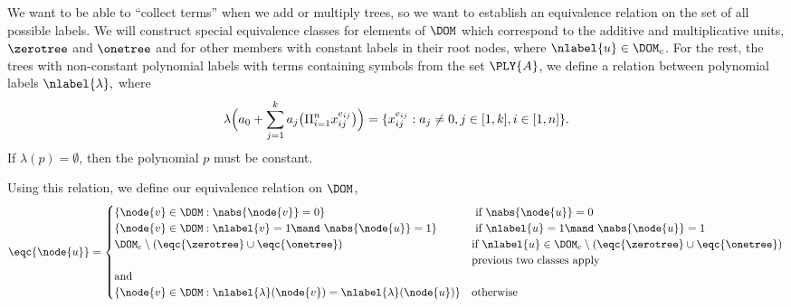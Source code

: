 \begin{definition}
  We want to be able to ``collect terms'' when we add or multiply
  trees, so we want to establish an equivalence relation on the set of
  all possible labels. We will construct special equivalence classes
  for elements of $\DOM$ which correspond to the additive and
  multiplicative units, $\zerotree$ and $\onetree$ and for other
  members with constant labels in their root nodes, where
  $\nlabel{u}\in\DOM_c$.  For the rest, the trees with non-constant
  polynomial labels with terms containing symbols from the set
  $\PLY{A}$, we define a relation between polynomial labels
  $\nlabel{\lambda},$ where
  \begin{equation}
    \lambda\Bigl(a_0 + \sum_{j=1}^k a_j \bigl(\Pi_{i=1}^n
    x_{i\/j}^{e_{i\/j}}\bigr)\Bigr)
    = \{x_{i\/j}^{e_{i\/j}}: a_j \neq 0, j\in[1,k], i\in[1,n]\}.
  \end{equation}
  If $\lambda(p) = \emptyset$, then the polynomial $p$ must be
  constant. 
  
  Using this relation, we define our equivalence relation on $\DOM$,
  \begin{equation}
    \eqc{\node{u}} = \begin{cases}
      \{\node{v} \in \DOM: \nabs{\node{v}} = 0\} & \text{ if } \nabs{\node{u}} = 0 \\
      \{\node{v} \in \DOM: \nlabel{v} = 1 \mand\ \nabs{\node{u}} = 1\} & \text{ if } \nlabel{u} = 1 \mand\ \nabs{\node{u}} = 1\\
      \DOM_c\setminus(\eqc{\zerotree} \cup \eqc{\onetree}) & \text{if } \nlabel{u}\in\DOM_c \setminus(\eqc{\zerotree} \cup \eqc{\onetree})\\
      &\text{previous two classes apply}\\
      \text{\hfill and } & \\
      \{\node{v} \in \DOM: \nlabel{\lambda}({\node{v}}) = \nlabel{\lambda}({\node{u}})\} & \text{otherwise}
    \end{cases}
  \end{equation}


\end{definition}
